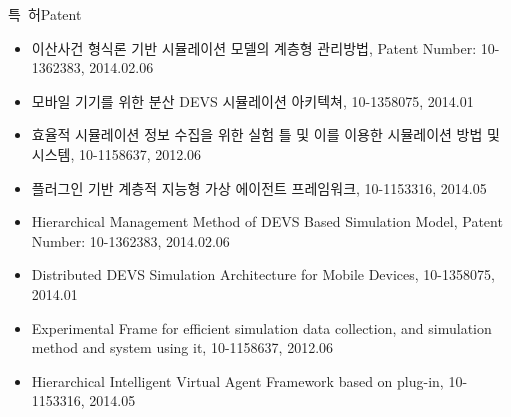 \documentclass[english,representative]{resume_structure}
\begin{document}
\begin{Others}
\ResumeSubSection %
    {특\ 허}{Patent}
    {}
    {
      \begin{itemize}
        \item 이산사건 형식론 기반 시뮬레이션 모델의 계층형 관리방법, Patent Number: 10-1362383, 2014.02.06
        \item 모바일 기기를 위한 분산 DEVS 시뮬레이션 아키텍쳐, 10-1358075, 2014.01
        \item 효율적 시뮬레이션 정보 수집을 위한 실험 틀 및 이를 이용한 시뮬레이션 방법 및 시스템, 10-1158637, 2012.06
        \item 플러그인 기반 계층적 지능형 가상 에이전트 프레임워크, 10-1153316, 2014.05
      \end{itemize}
    }
    {
      \begin{itemize}
        \item Hierarchical Management Method of DEVS Based Simulation Model, Patent Number: 10-1362383, 2014.02.06
        \item Distributed DEVS Simulation Architecture for Mobile Devices, 10-1358075, 2014.01
        \item Experimental Frame for efficient simulation data collection, and simulation method and system using it, 10-1158637, 2012.06
        \item Hierarchical Intelligent Virtual Agent Framework based on plug-in, 10-1153316, 2014.05
      \end{itemize}
    }
\end{Others}


\end{document}

